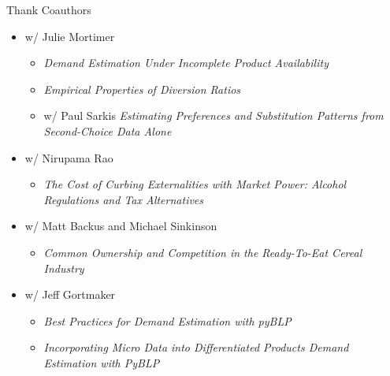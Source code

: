 \begin{frame}{Thank Coauthors}
\begin{itemize}
    \item w/ Julie Mortimer

    \begin{itemize}
        \item \textit{Demand Estimation Under Incomplete Product Availability}
        \item \textit {Empirical Properties of Diversion Ratios}
        \item w/ Paul Sarkis \textit{Estimating Preferences and Substitution Patterns from Second-Choice Data Alone }
    \end{itemize}

    \item w/ Nirupama Rao

    \begin{itemize}
        \item \textit{The Cost of Curbing Externalities with Market Power: Alcohol Regulations and Tax Alternatives}
    \end{itemize}

    \item w/ Matt Backus and Michael Sinkinson

    \begin{itemize}
        \item \textit{Common Ownership and Competition in the Ready-To-Eat Cereal Industry}
    \end{itemize}

    \item w/ Jeff Gortmaker 
    \begin{itemize}
        \item \textit{Best Practices for Demand Estimation with pyBLP}
        \item \textit{Incorporating Micro Data into Differentiated Products Demand Estimation with PyBLP}
    \end{itemize}

\end{itemize}
\end{frame}



